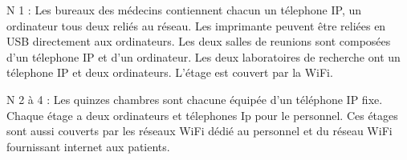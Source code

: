 %

N 1 :
Les bureaux des médecins contiennent chacun un télephone IP, un ordinateur tous deux reliés au réseau.
Les imprimante peuvent être reliées en USB directement aux ordinateurs.
Les deux salles de reunions sont composées d'un télephone IP et d'un ordinateur.
Les deux laboratoires de recherche ont un télephone IP et deux ordinateurs.
L'étage est couvert par la WiFi.

%

N 2 à 4 :
Les quinzes chambres sont chacune équipée d'un téléphone IP fixe.
Chaque étage a deux ordinateurs et télephones Ip pour le personnel.
Ces étages sont aussi couverts par les réseaux WiFi dédié au personnel et du réseau WiFi fournissant internet aux patients.

%
%















